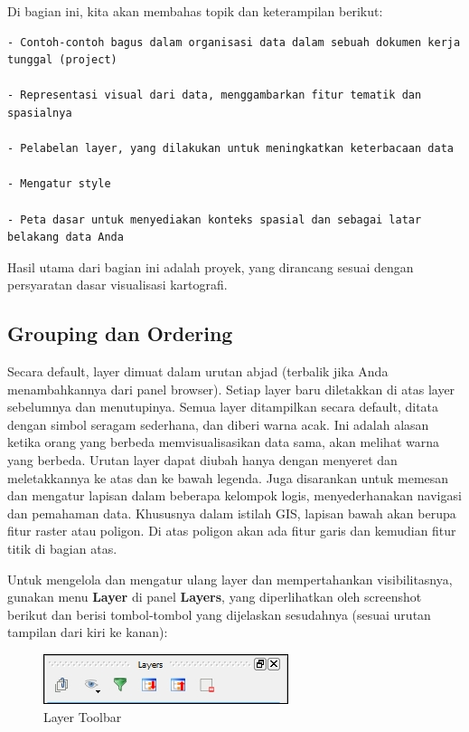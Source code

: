 \documentclass[]{book}
\begin{document}
Di bagian ini, kita akan membahas topik dan keterampilan berikut:

\begin{verbatim}
- Contoh-contoh bagus dalam organisasi data dalam sebuah dokumen kerja tunggal (project)

- Representasi visual dari data, menggambarkan fitur tematik dan spasialnya

- Pelabelan layer, yang dilakukan untuk meningkatkan keterbacaan data

- Mengatur style 

- Peta dasar untuk menyediakan konteks spasial dan sebagai latar belakang data Anda
\end{verbatim}

Hasil utama dari bagian ini adalah proyek, yang dirancang sesuai dengan persyaratan dasar visualisasi kartografi.

\hypertarget{grouping-dan-ordering}{%
\subsection{Grouping dan Ordering}\label{grouping-dan-ordering}}

Secara default, layer dimuat dalam urutan abjad (terbalik jika Anda menambahkannya dari panel browser). Setiap layer baru diletakkan di atas layer sebelumnya dan menutupinya. Semua layer ditampilkan secara default, ditata dengan simbol seragam sederhana, dan diberi warna acak. Ini adalah alasan ketika orang yang berbeda memvisualisasikan data sama, akan melihat warna yang berbeda. Urutan layer dapat diubah hanya dengan menyeret dan meletakkannya ke atas dan ke bawah legenda. Juga disarankan untuk memesan dan mengatur lapisan dalam beberapa kelompok logis, menyederhanakan navigasi dan pemahaman data. Khususnya dalam istilah GIS, lapisan bawah akan berupa fitur raster atau poligon. Di atas poligon akan ada fitur garis dan kemudian fitur titik di bagian atas.

Untuk mengelola dan mengatur ulang layer dan mempertahankan visibilitasnya, gunakan menu \textbf{Layer} di panel \textbf{Layers}, yang diperlihatkan oleh screenshot berikut dan berisi tombol-tombol yang dijelaskan sesudahnya (sesuai urutan tampilan dari kiri ke kanan):

\begin{figure}

{\centering \includegraphics[width=0.3\linewidth]{images/09/fig91} 

}

\caption{Layer Toolbar}\label{fig:fig91}
\end{figure}
\end{document}
